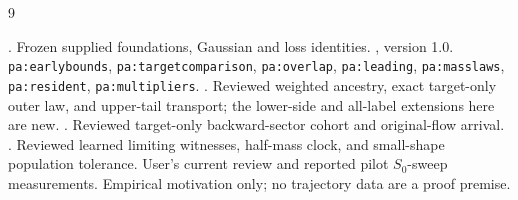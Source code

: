 \documentclass[11pt]{article}
\numberwithin{equation}{section}
\theoremstyle{remark}\newtheorem{remark}[theorem]{Remark}
\newcommand{\1}{\mathbf 1}
\begin{document}
\clearpage
\begin{thebibliography}{9}\footnotesize
\setlength{\itemsep}{1pt}\setlength{\parskip}{0pt}
\raggedright
{} .
Frozen supplied foundations, Gaussian and loss identities.
 , version 1.0.
\texttt{pa:earlybounds}, \texttt{pa:targetcomparison}, \texttt{pa:overlap},
\texttt{pa:leading}, \texttt{pa:masslaws}, \texttt{pa:resident},
\texttt{pa:multipliers}.
 .
Reviewed weighted ancestry, exact target-only outer law, and upper-tail
transport; the lower-side and all-label extensions here are new.
 .
Reviewed target-only backward-sector cohort and original-flow arrival.
 .
Reviewed learned limiting witnesses, half-mass clock, and small-shape
population tolerance.
 User's current review and reported pilot $S_0$-sweep
measurements. Empirical motivation only; no trajectory data are a proof
premise.
\end{thebibliography}
\end{document}
